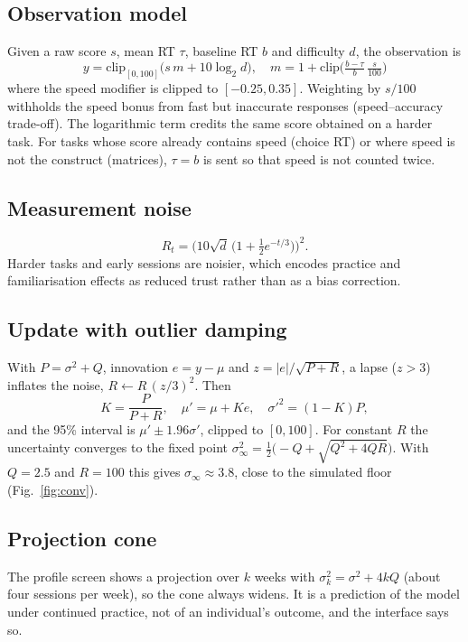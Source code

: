 \documentclass[conference]{IEEEtran}
\begin{document}
\subsection{Observation model}
Given a raw score $s$, mean RT $\tau$, baseline RT $b$ and difficulty $d$, the observation is
\begin{equation}
y=\mathrm{clip}_{[0,100]}\!\big(s\,m + 10\log_2 d\big),\quad m=1+\mathrm{clip}\!\Big(\tfrac{b-\tau}{b}\,\tfrac{s}{100}\Big)
\end{equation}
where the speed modifier is clipped to $[-0.25,0.35]$. Weighting by $s/100$ withholds the speed bonus from fast but inaccurate responses (speed--accuracy trade-off). The logarithmic term credits the same score obtained on a harder task. For tasks whose score already contains speed (choice RT) or where speed is not the construct (matrices), $\tau=b$ is sent so that speed is not counted twice.

\subsection{Measurement noise}
\begin{equation}
R_t=\Big(10\sqrt{d}\,\big(1+\tfrac12 e^{-t/3}\big)\Big)^2 .
\end{equation}
Harder tasks and early sessions are noisier, which encodes practice and familiarisation effects as reduced trust rather than as a bias correction.

\subsection{Update with outlier damping}
With $P=\sigma^2+Q$, innovation $e=y-\mu$ and $z=|e|/\sqrt{P+R}$, a lapse ($z>3$) inflates the noise, $R\leftarrow R\,(z/3)^2$. Then
\begin{equation}
K=\frac{P}{P+R},\quad \mu'=\mu+Ke,\quad \sigma'^2=(1-K)P,
\end{equation}
and the 95\% interval is $\mu'\pm1.96\sigma'$, clipped to $[0,100]$. For constant $R$ the uncertainty converges to the fixed point $\sigma_\infty^2=\tfrac12\big(-Q+\sqrt{Q^2+4QR}\big)$. With $Q=2.5$ and $R=100$ this gives $\sigma_\infty\approx3.8$, close to the simulated floor (Fig.~\ref{fig:conv}).

\subsection{Projection cone}
The profile screen shows a projection over $k$ weeks with $\sigma_k^2=\sigma^2+4kQ$ (about four sessions per week), so the cone always widens. It is a prediction of the model under continued practice, not of an individual's outcome, and the interface says so.
\end{document}
